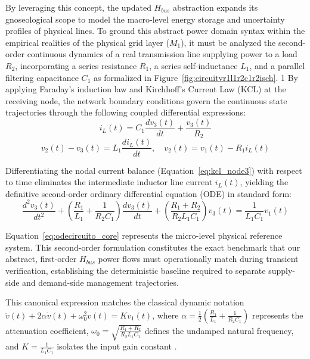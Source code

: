 \documentclass[energies,accept,oneauthor,pdftex]{Definitions/mdpi}
\begin{document}
By leveraging this concept, the updated $H_{bus}$ abstraction expands its gnoseological scope to model the macro-level energy storage and uncertainty profiles of physical lines. To ground this abstract power domain syntax within the empirical realities of the physical grid layer ($M_1$), it must be analyzed the second-order continuous dynamics of a real transmission line supplying power to a load $R_2$, incorporating a series resistance $R_1$, a series self-inductance $L_1$, and a parallel filtering capacitance $C_1$ as formalized in Figure~\ref{fig:circuitvr1l1r2c1r2isch}.
1
By applying Faraday's induction law and Kirchhoff's Current Law (KCL) at the receiving node, the network boundary conditions govern the continuous state trajectories through the following coupled differential expressions:
\begin{equation}
    i_L(t) = C_1 \frac{dv_3(t)}{dt} + \frac{v_3(t)}{R_2}
    \label{eq:kcl_node3}
\end{equation}
\begin{equation}
    v_2(t) - v_3(t) = L_1 \frac{di_L(t)}{dt}, \quad v_2(t) = v_1(t) - R_1 i_L(t)
\end{equation}

Differentiating the nodal current balance (Equation~\ref{eq:kcl_node3}) with respect to time eliminates the intermediate inductor line current $i_L(t)$, yielding the definitive second-order ordinary differential equation (ODE) in standard form:
\begin{equation}
    \frac{d^2v_3(t)}{dt^2} + \left( \frac{R_1}{L_1} + \frac{1}{R_2C_1} \right) \frac{dv_3(t)}{dt} + \left( \frac{R_1 + R_2}{R_2L_1C_1} \right) v_3(t) = \frac{1}{L_1C_1} v_1(t)
    \label{eq:odecircuito_core}
\end{equation}

Equation~\ref{eq:odecircuito_core} represents the micro-level physical reference system. This second-order formulation constitutes the exact benchmark that our abstract, first-order $H_{bus}$ power flows must operationally match during transient verification, establishing the deterministic baseline required to separate supply-side and demand-side management trajectories.

This canonical expression matches the classical dynamic notation $\ddot{v}(t) + 2\alpha \dot{v}(t) + \omega_0^2 v(t) = K v_1(t)$, where $\alpha = \frac{1}{2} \left( \frac{R_1}{L_1} + \frac{1}{R_2C_1} \right)$ represents the attenuation coefficient, $\omega_0 = \sqrt{\frac{R_1 + R_2}{R_2L_1C_1}}$ defines the undamped natural frequency, and $K = \frac{1}{L_1C_1}$ isolates the input gain constant \cite{Ogata2010ingenieria}.
\end{document}
